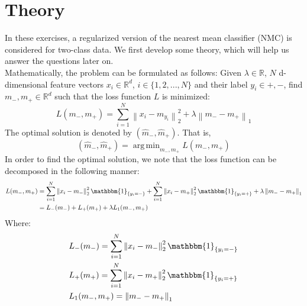 \documentclass [a4paper] {report}
\DeclareMathOperator*{\argmin}{arg\,min}
\newcommand{\norm}[1]{\left\lVert #1 \right\rVert}
\begin{document}
	\chapter*{Theory}
	\setcounter{page}{1}
	In these exercises, a regularized version of the nearest mean classifier (NMC) is considered for two-class data. We first develop some theory, which will help us answer the questions later on.\\
	Mathematically, the problem can be formulated as follows: Given $\lambda \in \mathbb{R}$, $N$ d-dimensional feature vectors $x_{i} \in \mathbb{R}^{d}$, $i \in \{ 1, 2, ..., N \}$ and their label $y_{i} \in {+,-}$, find $m_{-}, m_{+} \in \mathbb{R}^{d} $ such that the loss function $L$ is minimized:
	\begin{equation}
		L(m_{-},m_{+}) = \sum_{i=1}^{N} \norm{x_{i} - m_{y_{i}}}_{2}^{2} + \lambda \norm{m_{-} - m_{+}}_{1}
		\label{LossFunction1}
	\end{equation}
	The optimal solution is denoted by $(\hat{m}_{-},\hat{m}_{+})$. That is, 
	\begin{equation}
		(\hat{m}_{-},\hat{m}_{+}) = \argmin_{m_{-},m_{+}} L(m_{-},m_{+}) 
	\end{equation}
	In order to find the optimal solution, we note that the loss function can be decomposed in the following manner:
	\begin{equation}
		\begin{split}
			L(m_{-},m_{+}) &= \sum_{i=1}^{N} \norm{x_{i} - m_{-}}_{2}^{2} \mathbbm{1}_{\{y_{i}=-\}} + \sum_{i=1}^{N} \norm{x_{i} - m_{+}}_{2}^{2} \mathbbm{1}_{\{y_{i}=+\}}  + \lambda \norm{m_{-} - m_{+}}_{1} \\
			&= L_{-}(m_{-}) + L_{+}(m_{+}) + \lambda L_{1}(m_{-},m_{+})			
		\end{split}
	\end{equation}
	Where:
	\begin{equation}
		\begin{split}
			& L_{-}(m_{-}) = \sum_{i=1}^{N} \norm{x_{i} - m_{-}}_{2}^{2} \mathbbm{1}_{\{y_{i}=-\}}\\
			& L_{+}(m_{+}) = \sum_{i=1}^{N} \norm{x_{i} - m_{+}}_{2}^{2} \mathbbm{1}_{\{y_{i}=+\}}\\
			& L_{1}(m_{-},m_{+}) = \norm{m_{-} - m_{+}}_{1}
		\end{split}
	\end{equation}
	
\end{document}

